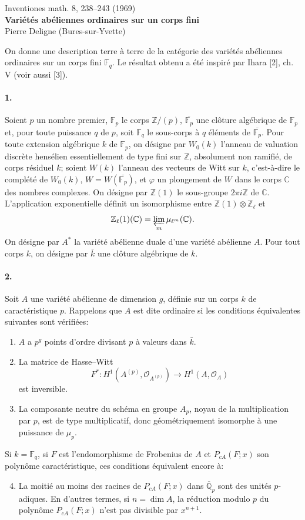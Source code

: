 \documentclass[10pt]{article}
\newcommand{\C}{\mathbb C}
\newcommand{\Fp}{\mathbb F_p}
\newcommand{\Fq}{\mathbb F_q}
\newcommand{\Q}{\mathbb Q}
\newcommand{\Z}{\mathbb Z}
\newcommand{\og}{\guillemotleft}
\newcommand{\fg}{\guillemotright}
\begin{document}
\begin{center}
{\small Inventiones math. 8, 238--243 (1969)}\\[3.0em]
{\Large\bfseries Variétés abéliennes ordinaires sur un corps fini}\\[1.0em]
{\large Pierre Deligne (Bures-sur-Yvette)}
\end{center}

On donne une description terre à terre de la catégorie des variétés abéliennes ordinaires sur un corps fini $\Fq$. Le résultat obtenu a été inspiré par Ihara [2], ch. V (voir aussi [3]).

\paragraph{1.} Soient $p$ un nombre premier, $\Fp$ le corps $\Z/(p)$, $\overline{\Fp}$ une clôture algébrique de $\Fp$ et, pour toute puissance $q$ de $p$, soit $\Fq$ le sous-corps à $q$ éléments de $\overline{\Fp}$. Pour toute extension algébrique $k$ de $\Fp$, on désigne par $W_0(k)$ l'anneau de valuation discrète hensélien essentiellement de type fini sur $\Z$, absolument non ramifié, de corps résiduel $k$; soient $W(k)$ l'anneau des vecteurs de Witt sur $k$, c'est-à-dire le complété de $W_0(k)$, $W=W(\overline{\Fp})$, et $\varphi$ un plongement de $W$ dans le corps $\C$ des nombres complexes. On désigne par $\Z(1)$ le sous-groupe $2\pi i\Z$ de $\C$. L'application exponentielle définit un isomorphisme entre $\Z(1)\otimes\Z_\ell$ et
\[
\Z_\ell(1)(\C)=\varprojlim_m\mu_{\ell^m}(\C).
\]
On désigne par $A^*$ la variété abélienne duale d'une variété abélienne $A$. Pour tout corps $k$, on désigne par $\bar k$ une clôture algébrique de $k$.

\paragraph{2.} Soit $A$ une variété abélienne de dimension $g$, définie sur un corps $k$ de caractéristique $p$. Rappelons que $A$ est dite ordinaire si les conditions équivalentes suivantes sont vérifiées:
\begin{enumerate}[label=(\Roman*)]
\item $A$ a $p^g$ points d'ordre divisant $p$ à valeurs dans $\bar k$.
\item La \og matrice de Hasse--Witt\fg
\[
F^*:H^1(A^{(p)},\mathcal O_{A^{(p)}})\longrightarrow H^1(A,\mathcal O_A)
\]
est inversible.
\item La composante neutre du schéma en groupe $A_p$, noyau de la multiplication par $p$, est de type multiplicatif, donc géométriquement isomorphe à une puissance de $\mu_p$.
\end{enumerate}
Si $k=\Fq$, si $F$ est l'endomorphisme de Frobenius de $A$ et $P_{cA}(F;x)$ son polynôme caractéristique, ces conditions équivalent encore à:
\begin{enumerate}[label=(\Roman*)]
\setcounter{enumi}{3}
\item La moitié au moins des racines de $P_{cA}(F;x)$ dans $\overline{\Q}_p$ sont des unités $p$-adiques. En d'autres termes, si $n=\dim A$, la réduction modulo $p$ du polynôme $P_{cA}(F;x)$ n'est pas divisible par $x^{n+1}$.
\end{enumerate}
\end{document}
